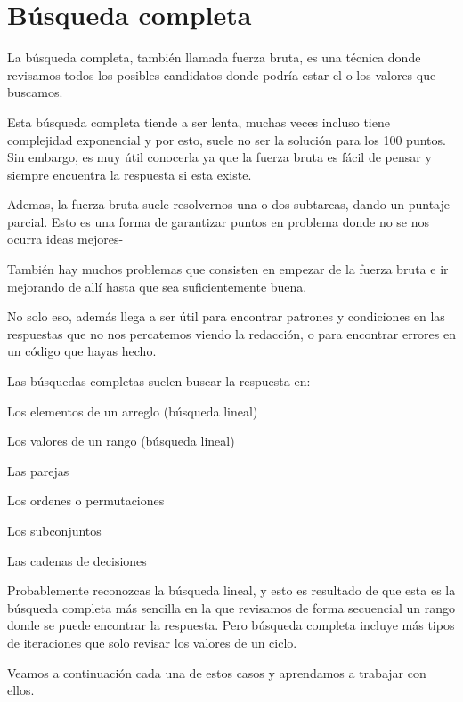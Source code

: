 \chapter*{Búsqueda completa}

La búsqueda completa, también llamada fuerza bruta, es una técnica donde revisamos todos los posibles candidatos donde podría estar el o los valores que buscamos.

Esta búsqueda completa tiende a ser lenta, muchas veces incluso tiene complejidad exponencial y por esto, suele no ser la solución para los 100 puntos. Sin embargo, es muy útil conocerla ya que la fuerza bruta es fácil de pensar y siempre encuentra la respuesta si esta existe.

Ademas, la fuerza bruta suele resolvernos una o dos subtareas, dando un puntaje parcial. Esto es una forma de garantizar puntos en problema donde no se nos ocurra ideas mejores-

También hay muchos problemas que consisten en empezar de la fuerza bruta e ir mejorando de allí hasta que sea suficientemente buena.

No solo eso, además llega a ser útil para encontrar patrones y condiciones en las respuestas que no nos percatemos viendo la redacción, o para encontrar errores en un código que hayas hecho.


Las búsquedas completas suelen buscar la respuesta en:

\begin{plimits}
	\item Los elementos de un arreglo (búsqueda lineal)
	\item Los valores de un rango (búsqueda lineal)
	\item Las parejas
	\item Los ordenes o permutaciones
	\item Los subconjuntos
	\item Las cadenas de decisiones
\end{plimits}

Probablemente reconozcas la búsqueda lineal, y esto es resultado de que esta es la búsqueda completa más sencilla en la que revisamos de forma secuencial un rango donde se puede encontrar la respuesta. Pero búsqueda completa incluye más tipos de iteraciones que solo revisar los valores de un ciclo.

Veamos a continuación cada una de estos casos y aprendamos a trabajar con ellos.